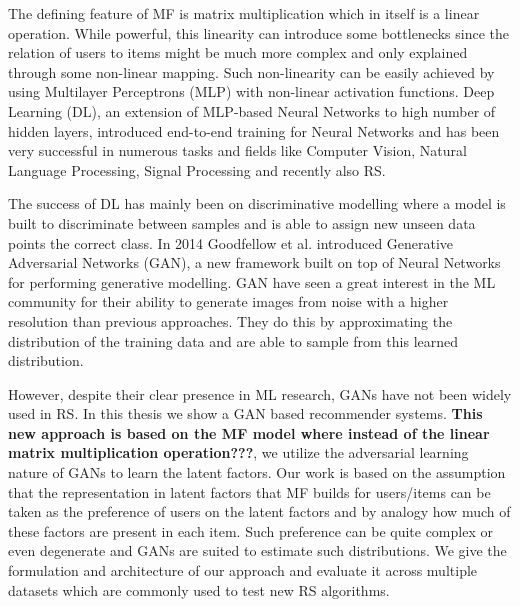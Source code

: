 The defining feature of MF is matrix multiplication which in itself is a linear operation. While powerful, this linearity can introduce some bottlenecks since the relation of users to items might be much more complex and only explained through some non-linear mapping. Such non-linearity can be easily achieved by using Multilayer Perceptrons (MLP) with non-linear activation functions. Deep Learning (DL), an extension of MLP-based Neural Networks to high number of hidden layers, introduced end-to-end training for Neural Networks and has been very successful in numerous tasks and fields like Computer Vision, Natural Language Processing, Signal Processing and recently also RS.

The success of DL has mainly been on discriminative modelling where a model is built to discriminate between samples and is able to assign new unseen data points the correct class. In 2014 Goodfellow et al. introduced Generative Adversarial Networks (GAN), a new framework built on top of Neural Networks for performing generative modelling. GAN have seen a great interest in the ML community for their ability to generate images from noise with a higher resolution than previous approaches. They do this by approximating the distribution of the training data and are able to sample from this learned distribution.

However, despite their clear presence in ML research, GANs have not been widely used in RS. In this thesis we show a GAN based recommender systems. \textbf{This new approach is based on the MF model where instead of the linear matrix multiplication operation???}, we utilize the adversarial learning nature of GANs to learn the latent factors. Our work is based on the assumption that the representation in latent factors that MF builds for users/items can be taken as the preference of users on the latent factors and by analogy how much of these factors are present in each item. Such preference can be quite complex or even degenerate and GANs are suited to estimate such distributions. We give the formulation and architecture of our approach and evaluate it across multiple datasets which are commonly used to test new RS algorithms.